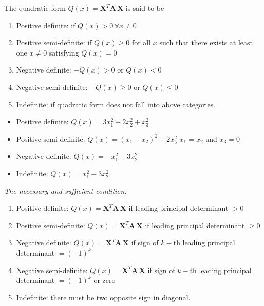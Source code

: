 \documentclass[../main-sheet.tex]{subfiles}
\begin{document}
The quadratic form \(Q(x)=\mathbf{X}^T\mathbf{A\,X}\) is said to be
\begin{enumerate}
    \item Positive definite: if \(Q(x)>0\,\forall \underline{x}\neq 0\)
    \item Positive semi-definite: if \(Q(x)\geq 0\) for all \(x\) such that there exists at least one \(x\neq 0\) satisfying \(Q(x)=0\)
    \item Negative definite: \(-Q(x)>0\) or \(Q(x)<0\)
    \item Negative semi-definite: \(-Q(x)\geq0\) or \(Q(x)\leq 0\)
    \item Indefinite: if quadratic form does not fall into above categories.
\end{enumerate}
\begin{ex}\hfill
    \begin{itemize}
        \item Positive definite: \(Q(x)=3x_1^2+2x_2^2+x_3^2\)
        \item Positive semi-definite: \(Q(x)=(x_1-x_2)^2+2x_3^2\) \(x_1=x_2\) and \(x_3=0\)
        \item Negative definite: \(Q(x)=-x_1^2-3x_2^2\)
        \item Indefinite: \(Q(x)=x_1^2-3x_2^2\)
    \end{itemize}
\end{ex}
\emph{The necessary and sufficient condition:}
\begin{enumerate}
    \item Positive definite: \(Q(x)=\mathbf{X}^T\mathbf{A\,X}\) if leading principal determinant \(>0\)
    \item Positive semi-definite: \(Q(x)=\mathbf{X}^T\mathbf{A\,X}\) if leading principal determinant \(\geq 0\)
    \item Negative definite: \(Q(x)=\mathbf{X}^T\mathbf{A\,X}\) if sign of \(k-\)th leading principal determinant \(=(-1)^k\)
    \item Negative semi-definite: \(Q(x)=\mathbf{X}^T\mathbf{A\,X}\) if sign of \(k-\)th leading principal determinant \(=(-1)^k\) or zero
    \item Indefinite: there must be two opposite sign in diagonal.
\end{enumerate}
\end{document}
